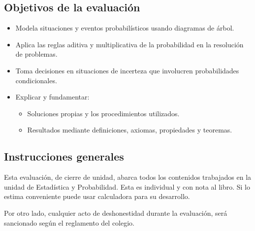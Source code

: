 \documentclass{cdplf-prueba}
\begin{document}
%
\begin{tcbraster}[enhanced,raster columns=3,raster width=\linewidth,raster column skip=3pt,raster force size=false]
    \begin{caja}[title={\sffamily\scshape\bfseries Nombre},height=30pt,add to width=4cm]
    \end{caja}
    \begin{caja}[title={\sffamily\scshape\bfseries Puntaje},height=30pt,add to width=-2cm]
    \end{caja}
    \begin{caja}[title={\sffamily\scshape\bfseries Nota},height=30pt,add to width=-2cm]
    \end{caja}                    
\end{tcbraster}

\subsection*{Objetivos de la evaluación}
\begin{itemize}[]
    \item Modela situaciones y eventos probabilísticos usando diagramas de árbol.
    \item Aplica las reglas aditiva y multiplicativa de la probabilidad en la resolución de problemas.
    \item Toma decisiones en situaciones de incerteza que involucren probabilidades condicionales.
    \item Explicar y fundamentar: 
    \begin{itemize}[]
        \item   Soluciones propias y los procedimientos utilizados.
        \item   Resultados mediante definiciones, axiomas, propiedades y teoremas.
    \end{itemize}
\end{itemize}

\subsection*{Instrucciones generales}

Esta evaluación, de cierre de unidad, abarca todos los contenidos trabajados en la unidad 
de Estadística y Probabilidad. Esta es individual y con nota al libro. Si lo estima conveniente 
puede usar calculadora para su desarrollo.

Por otro lado, cualquier acto de deshonestidad durante la evaluación, será sancionado según 
el reglamento del colegio.
\end{document}

